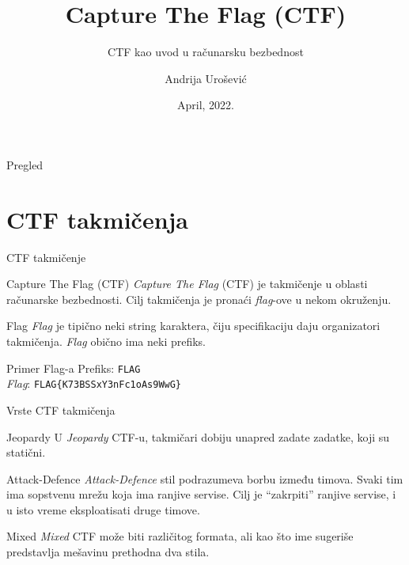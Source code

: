 \documentclass[aspectratio=169,xcolor=dvipsnames]{beamer}
\title[short title]{Capture The Flag (CTF)}
\subtitle{CTF kao uvod u računarsku bezbednost}
\author[andrija] {Andrija Urošević}
\institute[matf]
{
    Univerzitet u Beogradu \\
    Matematički fakultet
}
\date{April, 2022.}
\begin{document}
\begin{frame}
    \titlepage
\end{frame}

\begin{frame}{Pregled}
    \tableofcontents
\end{frame}

\section{CTF takmičenja}

\begin{frame}{CTF takmičenje}

    \begin{block}{Capture The Flag (CTF)}
        \emph{Capture The Flag} (CTF) je takmičenje u oblasti računarske 
        bezbednosti. Cilj takmičenja je pronaći \emph{flag}-ove u nekom 
        okruženju.
    \end{block}

    \begin{block}{Flag}
        \emph{Flag} je tipično neki string karaktera, čiju specifikaciju daju
        organizatori takmičenja. \emph{Flag} obično ima neki prefiks.
    \end{block}

    \begin{exampleblock}{Primer Flag-a}
        Prefiks: \texttt{FLAG} \\
        \emph{Flag}: \texttt{FLAG\{K73BSSxY3nFc1oAs9WwG\}}
    \end{exampleblock}


\end{frame}


\begin{frame}{Vrste CTF takmičenja}

    \begin{block}{Jeopardy}
        U \emph{Jeopardy} CTF-u, takmičari dobiju unapred zadate zadatke, 
        koji su statični.
    \end{block}

    \begin{block}{Attack-Defence}
        \emph{Attack-Defence} stil podrazumeva borbu između timova. Svaki 
        tim ima sopstvenu mrežu koja ima ranjive servise. Cilj je ``zakrpiti'' 
        ranjive servise, i u isto vreme eksploatisati druge timove. 
    \end{block}

    \begin{block}{Mixed}
        \emph{Mixed} CTF može biti različitog formata, ali kao što ime sugeriše 
        predstavlja mešavinu prethodna dva stila.
    \end{block}
    
\end{frame}
\end{document}
